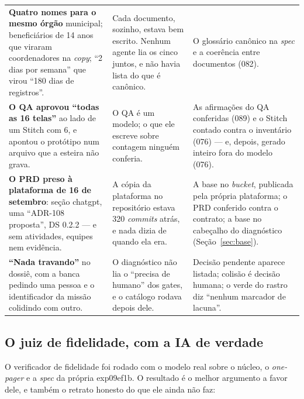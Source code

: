 \documentclass[11pt,a4paper]{article}
\newcommand{\cod}[1]{{\ttfamily\small #1}}
\begin{document}
\begin{center}
\begin{longtable}{p{5.0cm}p{4.7cm}p{5.0cm}}
\addlinespace
\footnotesize \textbf{Quatro nomes para o mesmo órgão} municipal; beneficiários de 14 anos que viraram coordenadores na \emph{copy}; ``2 dias por semana'' que virou ``180 dias de registros''. & \footnotesize Cada documento, sozinho, estava bem escrito. Nenhum agente lia os cinco juntos, e não havia lista do que é canônico. & \footnotesize O glossário canônico na \emph{spec} e a coerência entre documentos (082). \\
\addlinespace
\footnotesize \textbf{O QA aprovou ``todas as 16 telas''} ao lado de um Stitch com 6, e apontou o protótipo num arquivo que a esteira não grava. & \footnotesize O QA é um modelo; o que ele escreve sobre contagem ninguém conferia. & \footnotesize As afirmações do QA conferidas (089) e o Stitch contado contra o inventário (076) --- e, depois, gerado inteiro fora do modelo (076). \\
\addlinespace
\footnotesize \textbf{O PRD preso à plataforma de 16 de setembro}: seção \cod{chatgpt}, uma ``ADR-108 proposta'', DS 0.2.2 --- e sem atividades, equipes nem evidência. & \footnotesize A cópia da plataforma no repositório estava 320 \emph{commits} atrás, e nada dizia de quando ela era. & \footnotesize A base no \emph{bucket}, publicada pela própria plataforma; o PRD conferido contra o contrato; a base no cabeçalho do diagnóstico (Seção~\ref{sec:base}). \\
\addlinespace
\footnotesize \textbf{``Nada travando''} no dossiê, com a banca pedindo uma pessoa e o identificador da missão colidindo com outro. & \footnotesize O diagnóstico não lia o ``precisa de humano'' dos gates, e o catálogo rodava depois dele. & \footnotesize Decisão pendente aparece listada; colisão é decisão humana; o verde do rastro diz ``nenhum marcador de lacuna''. \\
\bottomrule
\end{longtable}
\end{center}

\subsection{O juiz de fidelidade, com a IA de verdade}

O verificador de fidelidade foi rodado com o modelo real sobre o núcleo, o \emph{one-pager} e a \emph{spec} da própria \cod{exp09ef1b}. O resultado é o melhor argumento a favor dele, e também o retrato honesto do que ele ainda não faz:
\end{document}
